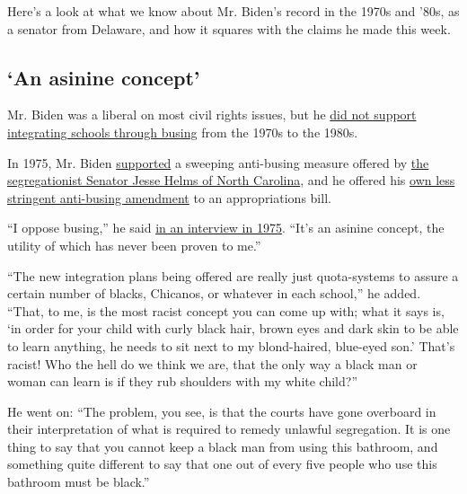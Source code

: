Here's a look at what we know about Mr. Biden's record in the 1970s and
'80s, as a senator from Delaware, and how it squares with the claims he
made this week.

\hypertarget{an-asinine-concept}{%
\subsection{`An asinine concept'}\label{an-asinine-concept}}

Mr. Biden was a liberal on most civil rights issues, but he
\href{https://www.nytimes3xbfgragh.onion/2019/06/21/us/politics/joe-biden-james-eastland.html?module=inline}{did
not support integrating schools through busing} from the 1970s to the
1980s.

In 1975, Mr. Biden
\href{https://www.govinfo.gov/content/pkg/GPO-CRECB-1975-pt22/pdf/GPO-CRECB-1975-pt22-6-2.pdf\#page=122}{supported}
a sweeping anti-busing measure offered by
\href{https://www.nytimes3xbfgragh.onion/2008/07/05/us/politics/00helms.html?module=inline}{the
segregationist Senator Jesse Helms of North Carolina}, and he offered
his
\href{https://www.nytimes3xbfgragh.onion/1975/09/18/archives/anti-busing-measure-approved-in-senate.html?module=inline}{own
less stringent anti-busing amendment} to an appropriations bill.

``I oppose busing,'' he said
\href{https://www.washingtonpost.com/transcript-of-then-sen-biden-s-interview-with-the-people-paper/3d9be388-6871-4993-ae53-869a88c3c6eb_note.html?questionId=bdc5761e-0777-4db5-9d00-e22e67012c96\&utm_term=.650a28e274a6}{in
an interview in 1975}. ``It's an asinine concept, the utility of which
has never been proven to me.''

``The new integration plans being offered are really just quota-systems
to assure a certain number of blacks, Chicanos, or whatever in each
school,'' he added. ``That, to me, is the most racist concept you can
come up with; what it says is, `in order for your child with curly black
hair, brown eyes and dark skin to be able to learn anything, he needs to
sit next to my blond-haired, blue-eyed son.' That's racist! Who the hell
do we think we are, that the only way a black man or woman can learn is
if they rub shoulders with my white child?''

He went on: ``The problem, you see, is that the courts have gone
overboard in their interpretation of what is required to remedy unlawful
segregation. It is one thing to say that you cannot keep a black man
from using this bathroom, and something quite different to say that one
out of every five people who use this bathroom must be black.''

